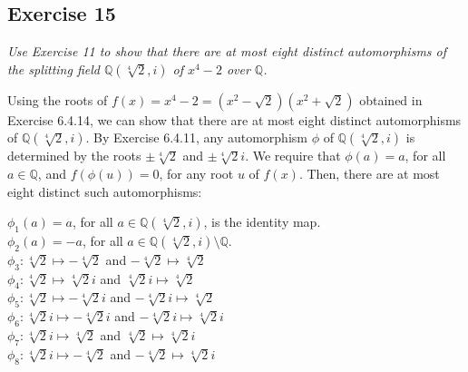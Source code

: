\subsection*{Exercise 15}
\textit{Use Exercise 11 to show that there are at most eight distinct automorphisms of the splitting field $\mathbb{Q}(\sqrt[4]{2},i)$ of $x^4 - 2$ over $\mathbb{Q}$.}

\vspace{5 mm}
Using the roots of $f(x) = x^4 - 2 = (x^2 - \sqrt{2})(x^2 + \sqrt{2})$ obtained in Exercise 6.4.14, we can show that there are at most eight distinct automorphisms of $\mathbb{Q}(\sqrt[4]{2},i)$.  By Exercise 6.4.11, any automorphism $\phi$ of $\mathbb{Q}(\sqrt[4]{2},i)$ is determined by the roots $\pm\sqrt[4]{2}$ and $\pm\sqrt[4]{2}i$. We require that $\phi(a) = a$, for all $a \in \mathbb{Q}$, and $f(\phi(u)) = 0$, for any root $u$ of $f(x)$. Then, there are at most eight distinct such automorphisms:

$\phi_1(a) = a$, for all $a \in \mathbb{Q}(\sqrt[4]{2},i)$, is the identity map. \\
$\phi_2(a) = -a$, for all $a \in \mathbb{Q}(\sqrt[4]{2},i)\setminus \mathbb{Q}$. \\
$\phi_3: \sqrt[4]{2} \mapsto -\sqrt[4]{2}$ and $-\sqrt[4]{2} \mapsto \sqrt[4]{2}$ \\
$\phi_4: \sqrt[4]{2} \mapsto \sqrt[4]{2}i$ and $\sqrt[4]{2}i \mapsto \sqrt[4]{2}$ \\
$\phi_5: \sqrt[4]{2} \mapsto -\sqrt[4]{2}i$ and $-\sqrt[4]{2}i \mapsto \sqrt[4]{2}$ \\
$\phi_6: \sqrt[4]{2}i \mapsto -\sqrt[4]{2}i$ and $-\sqrt[4]{2}i \mapsto \sqrt[4]{2}i$ \\
$\phi_7: \sqrt[4]{2}i \mapsto \sqrt[4]{2}$ and $\sqrt[4]{2} \mapsto \sqrt[4]{2}i$ \\
$\phi_8: \sqrt[4]{2}i \mapsto -\sqrt[4]{2}$ and $-\sqrt[4]{2} \mapsto \sqrt[4]{2}i$ \\
